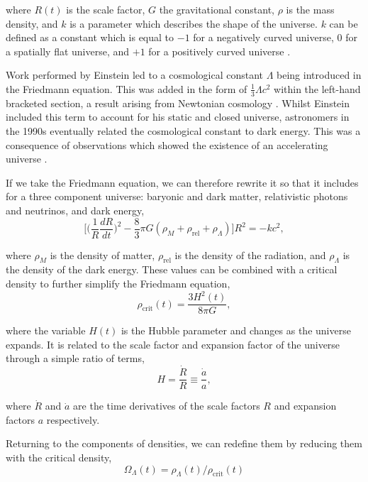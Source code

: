 \documentclass[twocolumn]{revtex4}
\begin{document}
where $R(t)$ is the scale factor, $G$ the gravitational constant, $\rho$ is the mass density, and $k$ is a parameter which describes the shape of the universe. $k$ can be defined as a constant which is equal to $-1$ for a negatively curved universe, $0$ for a spatially flat universe, and $+1$ for a positively curved universe \cite{mod_ast, longair}. 

Work performed by Einstein led to a cosmological constant $\Lambda$ being introduced in the Friedmann equation. This was added in the form of $\tfrac{1}{3}\Lambda c^2$ within the left-hand bracketed section, a result arising from Newtonian cosmology \cite{mod_ast}. Whilst Einstein included this term to account for his static and closed universe, astronomers in the 1990s eventually related the cosmological constant to dark energy. This was a consequence of observations which showed the existence of an accelerating universe \cite{mod_ast}. 

If we take the Friedmann equation, we can therefore rewrite it so that it includes for a three component universe: baryonic and dark matter, relativistic photons and neutrinos, and dark energy, 
\begin{equation}
\Big[ \Big( \frac{1}{R} \frac{dR}{dt} \Big)^2 - \frac{8}{3} \pi G (\rho_{M} + \rho_{\text{rel}} + \rho_{\Lambda} )\Big] R^2 = -kc^2,
\end{equation}

where $\rho_{M}$ is the density of matter, $\rho_{\text{rel}}$ is the density of the radiation, and $\rho_{\Lambda}$ is the density of the dark energy. These values can be combined with a critical density to further simplify the Friedmann equation,
\begin{equation}
\rho_{\text{crit}} (t) = \frac{3 H^2(t)}{8 \pi G},
\end{equation}

where the variable $H(t)$ is the Hubble parameter and changes as the universe expands. It is related to the scale factor and expansion factor of the universe through a simple ratio of terms,
\begin{equation}
H = \frac{\dot{R}}{R} \equiv \frac{\dot{a}}{a},
\end{equation}

where $\dot{R}$ and $\dot{a}$ are the time derivatives of the scale factors $R$ and expansion factors $a$ respectively.

Returning to the components of densities, we can redefine them by reducing them with the critical density,
\begin{equation}
\Omega_{\Lambda}(t) = \rho_{\Lambda}(t) / \rho_{\text{crit}}(t)
\label{eqn:omg_lam}
\end{equation}
\end{document}
